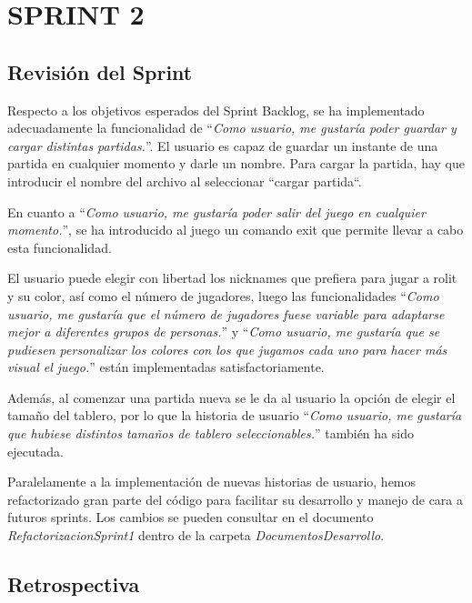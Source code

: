 \documentclass[../../FINAL/Scrum/SCRUM.tex]{subfiles}
\begin{document}
\section{SPRINT 2}
\subsection{Revisión del Sprint}
Respecto a los objetivos esperados del Sprint Backlog, se ha implementado adecuadamente la funcionalidad de ``\textit{Como usuario, me gustaría poder guardar y cargar distintas partidas.}''. El usuario es capaz de guardar un instante de una partida en cualquier momento y darle un nombre. Para cargar la partida, hay que introducir el nombre del archivo al seleccionar ``cargar partida``.

En cuanto a ``\textit{Como usuario, me gustaría poder salir del juego en cualquier momento.}'', se ha introducido al juego un comando exit que permite llevar a cabo esta funcionalidad.

El usuario puede elegir con libertad los nicknames que prefiera para jugar a rolit y su color, así como el número de jugadores, luego las funcionalidades ``\textit{Como usuario, me gustaría que el número de jugadores fuese variable para adaptarse mejor a diferentes grupos de personas.}'' y ``\textit{Como usuario, me gustaría que se pudiesen personalizar los colores con los que jugamos cada uno para hacer más visual el juego.}''  están implementadas satisfactoriamente.

Además, al comenzar una partida nueva se le da al usuario la opción de elegir el tamaño del tablero, por lo que la historia de usuario ``\textit{Como usuario, me gustaría que hubiese distintos tamaños de tablero seleccionables.}'' también ha sido ejecutada.

Paralelamente a la implementación de nuevas historias de usuario, hemos refactorizado gran parte del código para facilitar su desarrollo y manejo de cara a futuros sprints. Los cambios se pueden consultar en el documento \textit{RefactorizacionSprint1} dentro de la carpeta \textit{DocumentosDesarrollo}.

\subsection{Retrospectiva}
\end{document}
